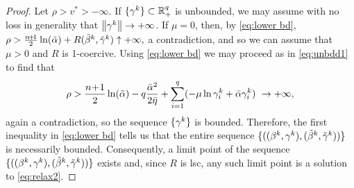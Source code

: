 \begin{proof}
Let $\rho> v^*>-\infty$. If $\{\gamma^k\}\subset\operatorname{\mathbb{R}}^q_+$ is unbounded, we may assume with no
loss in generality that $\left\Vert \gamma^k\right\Vert\rightarrow+\infty$. 
If $\mu=0$, then, by  \eqref{eq:lower bd},
\(
\rho>\frac{n\!+\!1}{2}\ln({\tilde\alpha})+R(\tilde\beta^k,{\tilde{\gamma}}^k)
\uparrow +\infty,
\)
a contradiction, and so we can assume that $\mu>0$ and $R$ is 1-coercive.
Using \eqref{eq:lower bd} we may proceed as in \eqref{eq:unbdd1} to find that
\begin{equation}\label{eq:lbd2}
\rho > \frac{n\!+\!1}{2}\ln(\talf)
-q\frac{\balf^2}{2\blam}+\sum_{i=1}^q
(-\mu\ln \gam^k_i+\balf\gam^k_i)\ 
\rightarrow +\infty,
\end{equation}
again a contradiction, so the sequence $\{\gamma^k\}$ is bounded.
Therefore, the first inequality in \eqref{eq:lower bd} tells us that the entire sequence 
$\{((\beta^k,\gamma^k),(\tilde\beta^k,{\tilde{\gamma}}^k))\}$ is necessarily bounded.
Consequently, a limit point of the sequence $\{((\beta^k,\gamma^k),(\tilde\beta^k,{\tilde{\gamma}}^k))\}$ exists and,
since $R$ is lsc, any such
limit point is a solution to 
\eqref{eq:relax2}.
\end{proof}

